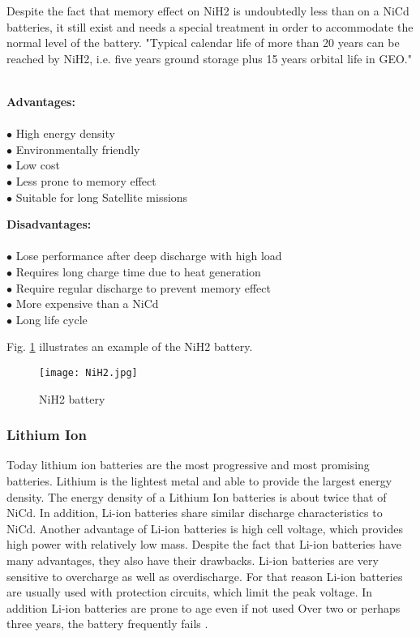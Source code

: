  Despite the fact that memory effect on NiH2 is undoubtedly less than on a NiCd batteries, it still exist and needs a special treatment in order to accommodate the normal level of the battery. \cite{8} "Typical calendar life of more than 20 years can be reached by NiH2, i.e. five years ground storage plus 15  years  orbital  life  in  GEO." \\ \\


\begin{multicols}{2}
	
	\textbf{Advantages:} \\ \\
	$\bullet$ High energy density\\
	$\bullet$ Environmentally friendly\\
	$\bullet$ Low cost\\
	$\bullet$ Less prone to memory effect\\
	$\bullet$ Suitable for long Satellite missions\\
	

	
	
	\columnbreak
	
	\textbf{Disadvantages:} \\ \\
	$\bullet$ Lose performance after deep discharge with high load\\
	$\bullet$ Requires long charge time due to heat generation\\
	$\bullet$ Require regular discharge to prevent memory effect\\ 
	$\bullet$ More expensive than a NiCd\\
	$\bullet$ Long life cycle

	
\end{multicols}

Fig. \ref{fig: nih2} illustrates an example of the NiH2 battery. 


\begin{figure}[h]
	\centering
	\texttt{[image: NiH2.jpg]}
	\caption{ NiH2 battery \cite{10}}
	\label{fig: nih2}
\end{figure}

\subsubsection{Lithium Ion \label{sec:tech}}

Today lithium ion batteries are the most progressive and most promising batteries. Lithium is the lightest metal and able to provide the largest energy density. The energy density of a Lithium Ion batteries is about twice that of NiCd. In addition, Li-ion batteries share similar discharge characteristics to NiCd. Another advantage of Li-ion batteries is high cell voltage, which provides high power with relatively low mass. Despite the fact that Li-ion batteries have many advantages, they also have their drawbacks. Li-ion batteries are very sensitive to overcharge as well as overdischarge. For that reason Li-ion batteries are usually used with protection circuits, which limit the peak voltage. In addition Li-ion batteries are prone to age even if not used  Over two or perhaps three years, the battery frequently fails \cite{7}.


